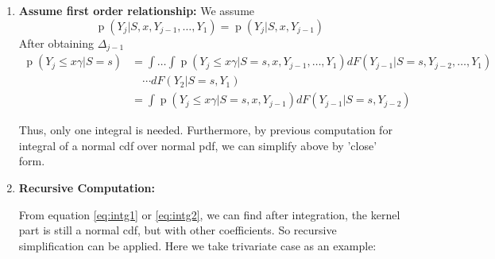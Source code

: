 \documentclass[12pt]{article}
\DeclareMathOperator{\pr}{p}
\begin{document}
\begin{enumerate}
\item \textbf{Assume first order relationship:} We assume
  \begin{equation}
    \pr (Y_j|S, x, Y_{j-1}, \ldots, Y_1) = \pr (Y_j|S, x, Y_{j-1})
  \end{equation}
  After obtaining $\Delta_{j-1}$
  \begin{align*}
    \pr (Y_j \leq  x\gamma | S = s) & =  \int\dots\int \pr (Y_j \leq x\gamma | S=s, x, Y_{j-1}, \ldots, Y_1) dF(Y_{j-1}|S=s, Y_{j-2}, \ldots, Y_1)\\
    & \quad  \cdots dF(Y_2|S=s, Y_1) \\
    & = \int \pr (Y_j \leq x\gamma | S=s, x, Y_{j-1}) dF(Y_{j-1}|S=s, Y_{j-2})
  \end{align*}

  Thus, only one integral is needed. Furthermore, by previous
  computation for integral of a normal cdf over normal pdf, we can
  simplify above by 'close' form.

\item \textbf{Recursive Computation: }

  From equation \eqref{eq:intg1} or \eqref{eq:intg2}, we can find
  after integration, the kernel part is still a normal cdf, but with
  other coefficients. So recursive simplification can be applied. Here
  we take trivariate case as an example:


\end{enumerate}
\end{document}
